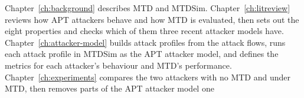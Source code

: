 \documentclass{cshonours}
\begin{document}
\medskip
\noindent Chapter~\ref{ch:background} describes MTD and MTDSim.
Chapter~\ref{ch:litreview} reviews how APT attackers behave and how MTD is
evaluated, then sets out the eight properties and checks which of them three
recent attacker models have. Chapter~\ref{ch:attacker-model} builds attack
profiles from the attack flows, runs each attack profile in MTDSim as the APT
attacker model, and defines the metrics for each attacker's behaviour and
MTD's performance. Chapter~\ref{ch:experiments} compares the two attackers
with no MTD and under MTD, then removes parts of the APT attacker model one
\end{document}
